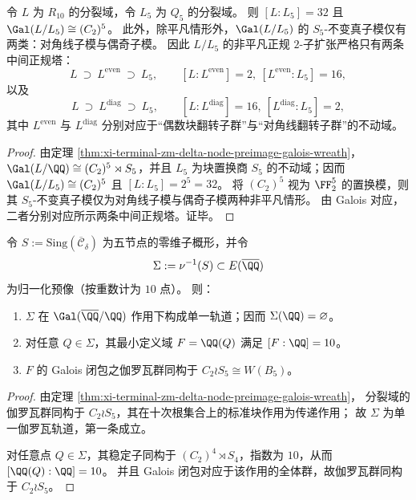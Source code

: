 \begin{corollary}\label{cor:xi-terminal-zm-delta-node-preimage-maximal-2-extension}
令 \(L\) 为 \(R_{10}\) 的分裂域，令 \(L_5\) 为 \(Q_5\) 的分裂域。
则 \([L:L_5]=32\) 且 \(\Gal(L/L_5)\cong (C_2)^5\)。
此外，除平凡情形外，\(\Gal(L/L_5)\) 的 \(S_5\)-不变真子模仅有两类：对角线子模与偶奇子模。
因此 \(L/L_5\) 的非平凡正规 \(2\)-子扩张严格只有两条中间正规塔：
\[
L\ \supset\ L^{\mathrm{even}}\ \supset\ L_5,\qquad [L:L^{\mathrm{even}}]=2,\ [L^{\mathrm{even}}:L_5]=16,
\]
以及
\[
L\ \supset\ L^{\mathrm{diag}}\ \supset\ L_5,\qquad [L:L^{\mathrm{diag}}]=16,\ [L^{\mathrm{diag}}:L_5]=2,
\]
其中 \(L^{\mathrm{even}}\) 与 \(L^{\mathrm{diag}}\) 分别对应于“偶数块翻转子群”与“对角线翻转子群”的不动域。
\end{corollary}
\begin{proof}
由定理 \ref{thm:xi-terminal-zm-delta-node-preimage-galois-wreath}，\(\Gal(L/\QQ)\cong (C_2)^5\rtimes S_5\)，并且 \(L_5\) 为块置换商 \(S_5\) 的不动域；因而
\(
\Gal(L/L_5)\cong (C_2)^5
\)
且 \([L:L_5]=2^5=32\)。
将 \((C_2)^5\) 视为 \(\FF_2^5\) 的置换模，则其 \(S_5\)-不变真子模仅为对角线子模与偶奇子模两种非平凡情形。
由 Galois 对应，二者分别对应所示两条中间正规塔。证毕。
\end{proof}

\begin{proposition}\label{prop:xi-terminal-zm-delta-node-preimage-orbit-degree10}
令 \(S:=\mathrm{Sing}(\overline{\mathcal C}_\delta)\) 为五节点的零维子概形，并令
\[
\Sigma:=\nu^{-1}(S)\subset E(\overline{\QQ})
\]
为归一化预像（按重数计为 \(10\) 点）。
则：
\begin{enumerate}
  \item \(\Sigma\) 在 \(\Gal(\overline{\QQ}/\QQ)\) 作用下构成单一轨道；因而 \(\Sigma(\QQ)=\varnothing\)。
  \item 对任意 \(Q\in \Sigma\)，其最小定义域 \(F=\QQ(Q)\) 满足 \([F:\QQ]=10\)。
  \item \(F\) 的 Galois 闭包之伽罗瓦群同构于 \(C_2\wr S_5\cong W(B_5)\)。
\end{enumerate}
\end{proposition}
\begin{proof}
由定理 \ref{thm:xi-terminal-zm-delta-node-preimage-galois-wreath}，
分裂域的伽罗瓦群同构于 \(C_2\wr S_5\)，其在十次根集合上的标准块作用为传递作用；
故 \(\Sigma\) 为单一伽罗瓦轨道，第一条成立。
\par
对任意点 \(Q\in\Sigma\)，其稳定子同构于 \((C_2)^4\rtimes S_4\)，指数为 \(10\)，从而 \([\QQ(Q):\QQ]=10\)。
并且 Galois 闭包对应于该作用的全体群，故伽罗瓦群同构于 \(C_2\wr S_5\)。
\end{proof}

\endinput


